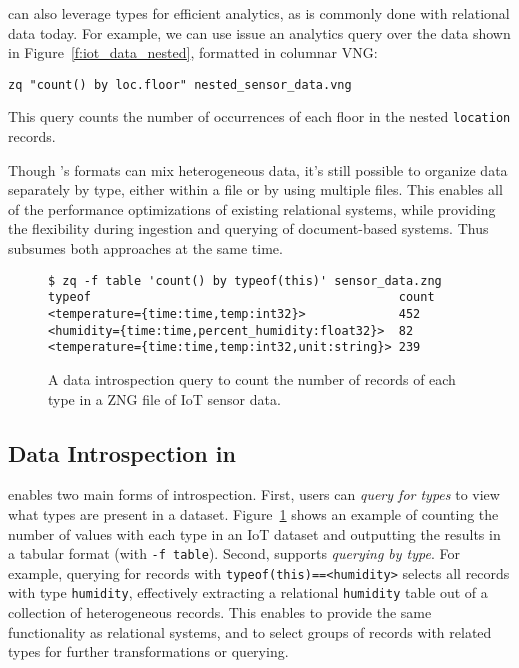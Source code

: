 \sys{} can also leverage types for efficient analytics, as is commonly done with relational data today. For example, we can use issue an analytics query over the data shown in Figure~\ref{f:iot_data_nested}, formatted in columnar VNG:

\texttt{zq "count() by loc.floor" nested\_sensor\_data.vng}

\noindent{}This query counts the number of occurrences of each floor in the nested \texttt{location} records.

Though \sys{}'s formats can mix heterogeneous data, it's still possible to organize data separately by type, either within a file or by using multiple files. This enables all of the performance optimizations of existing relational systems, while providing the flexibility during ingestion and querying of document-based systems. Thus \sys{} subsumes both approaches at the same time.



\begin{figure}
    \begin{verbatim}
$ zq -f table 'count() by typeof(this)' sensor_data.zng
typeof                                           count
<temperature={time:time,temp:int32}>             452
<humidity={time:time,percent_humidity:float32}>  82
<temperature={time:time,temp:int32,unit:string}> 239
    \end{verbatim}
    \vspace{-1.3em}
    \caption{A data introspection query to count the number of records of each type in a ZNG file of IoT sensor data. }
    \label{f:count_by_type}
    \vspace{-1.5em}
\end{figure}

\vspace{-0.9em}
\subsection{Data Introspection in \sys{}} \label{ss:zed_in_action_types}

\sys{} enables two main forms of introspection. First, users can {\em query for types} to view what types are present in a dataset. Figure~\ref{f:count_by_type} shows an example of counting the number of values with each type in an IoT dataset and outputting the results in a tabular format (with \texttt{-f table}). Second, \sys{} supports {\em querying by type}. For example, querying for records with \texttt{typeof(this)==<humidity>} selects all records with type \texttt{humidity}, effectively extracting a relational \texttt{humidity} table out of a collection of heterogeneous records.
This enables \sys{} to provide the same functionality as relational systems, and to select groups of records with related types for further transformations or querying.


